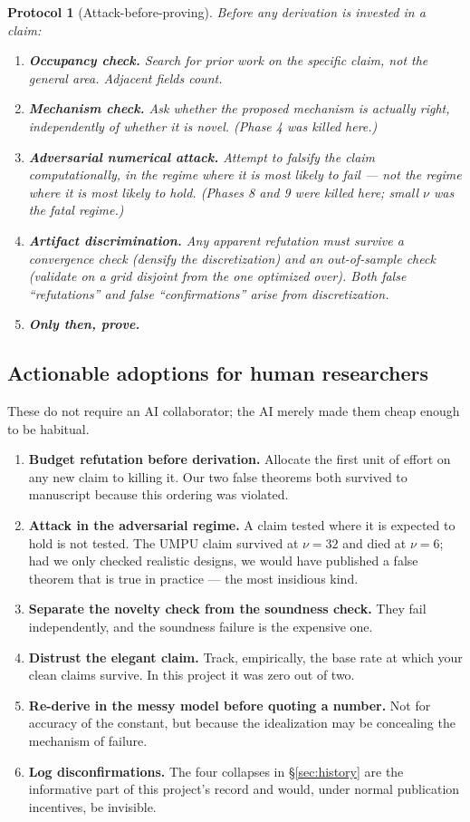 \documentclass[11pt]{article}
\newtheorem{protocol}{Protocol}
\theoremstyle{remark}
\begin{document}
\begin{protocol}[Attack-before-proving]
\label{prot:abp}
Before any derivation is invested in a claim:
\begin{enumerate}
\item \textbf{Occupancy check.} Search for prior work on the specific claim, not the general area. Adjacent fields count.
\item \textbf{Mechanism check.} Ask whether the proposed mechanism is \emph{actually right}, independently of whether it is novel. (Phase 4 was killed here.)
\item \textbf{Adversarial numerical attack.} Attempt to \emph{falsify} the claim computationally, in the regime where it is most likely to fail --- not the regime where it is most likely to hold. (Phases 8 and 9 were killed here; small $\nu$ was the fatal regime.)
\item \textbf{Artifact discrimination.} Any apparent refutation must survive a convergence check (densify the discretization) and an out-of-sample check (validate on a grid disjoint from the one optimized over). Both false ``refutations'' and false ``confirmations'' arise from discretization.
\item \textbf{Only then, prove.}
\end{enumerate}
\end{protocol}

\subsection{Actionable adoptions for human researchers}
These do not require an AI collaborator; the AI merely made them cheap enough to be habitual.

\begin{enumerate}
\item \textbf{Budget refutation before derivation.} Allocate the first unit of effort on any new claim to killing it. Our two false theorems both survived to manuscript because this ordering was violated.
\item \textbf{Attack in the adversarial regime.} A claim tested where it is expected to hold is not tested. The UMPU claim survived at $\nu=32$ and died at $\nu=6$; had we only checked realistic designs, we would have published a false theorem that is true in practice --- the most insidious kind.
\item \textbf{Separate the novelty check from the soundness check.} They fail independently, and the soundness failure is the expensive one.
\item \textbf{Distrust the elegant claim.} Track, empirically, the base rate at which your clean claims survive. In this project it was zero out of two.
\item \textbf{Re-derive in the messy model before quoting a number.} Not for accuracy of the constant, but because the idealization may be concealing the mechanism of failure.
\item \textbf{Log disconfirmations.} The four collapses in \S\ref{sec:history} are the informative part of this project's record and would, under normal publication incentives, be invisible.
\end{enumerate}
\end{document}

